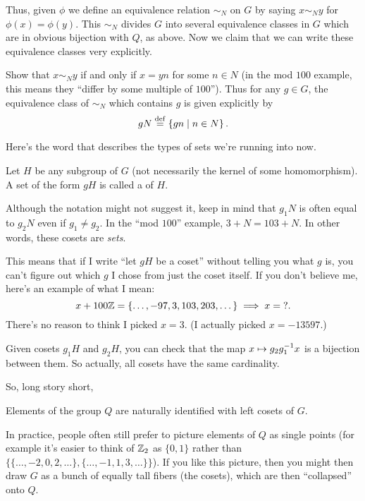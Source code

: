 Thus, given $\phi$ we define an equivalence relation $\sim_N$
on $G$ by saying $x \sim_N y$ for $\phi(x) = \phi(y)$.
This $\sim_N$ divides $G$ into several equivalence classes in $G$
which are in obvious bijection with $Q$, as above.
Now we claim that we can write these equivalence classes very explicitly.

\begin{exercise}
	Show that $x \sim_N y$ if and only if $x = yn$ for some $n \in N$
	(in the mod $100$ example, this means they ``differ by some multiple of $100$'').
	Thus for any $g \in G$, the equivalence class of $\sim_N$ which contains $g$
	is given explicitly by \[ gN \overset{\mathrm{def}}{=} \left\{ gn \mid n \in N \right\}. \]
\end{exercise}

Here's the word that describes the types of sets we're running into now.
\begin{definition}
	Let $H$ be any subgroup of $G$ (not necessarily the kernel of some homomorphism).
	A set of the form $gH$ is called a  of $H$.
\end{definition}
\begin{remark}
	Although the notation might not suggest it,
	keep in mind that $g_1N$ is often equal to $g_2N$ even if $g_1 \neq g_2$.
	In the ``mod $100$'' example, $3+N = 103+N$.
	In other words, these cosets are \emph{sets}.

	This means that if I write ``let $gH$ be a coset'' without telling you what $g$ is,
	you can't figure out which $g$ I chose from just the coset itself.
	If you don't believe me, here's an example of what I mean:
	\[ x+100\mathbb Z = \left\{ \dots, -97, 3, 103, 203, \dots \right\} \implies x = {?}. \]
	There's no reason to think I picked $x=3$. (I actually picked $x=-13597$.)
	\label{remark:coset_warning}
\end{remark}
\begin{remark}
	Given cosets $g_1H$ and $g_2H$,
	you can check that the map $x \mapsto g_2g_1^{-1} x$ is a bijection between them.
	So actually, all cosets have the same cardinality.
\end{remark}

So, long story short,
\begin{moral}
	Elements of the group $Q$ are naturally identified with left cosets of $G$.
\end{moral}
In practice, people often still prefer to picture elements of $Q$ as single points
(for example it's easier to think of $\mathbb Z_{2}$ as $\{0,1\}$
rather than $\big\{ \{\dots,-2,0,2,\dots\}, \{\dots,-1,1,3,\dots\} \big\}$).
If you like this picture,
then you might then draw $G$ as a bunch of equally tall fibers (the cosets),
which are then ``collapsed'' onto $Q$.

